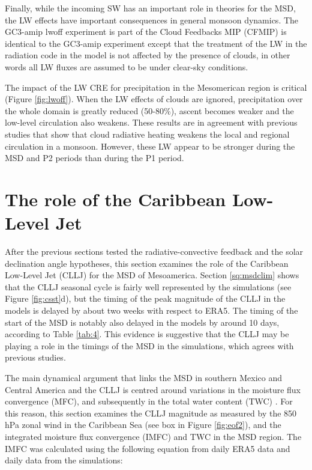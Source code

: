 Finally, while the incoming SW has an important role in theories for the MSD, the LW effects have important consequences in general monsoon dynamics. 
The GC3-amip lwoff experiment is part of the Cloud Feedbacks MIP (CFMIP) is identical to the GC3-amip experiment except that the treatment of the LW in the radiation code in the model is not affected by the presence of clouds, in other words all LW fluxes are assumed to be under clear-sky conditions. 

The impact of the LW CRE for precipitation in the Mesomerican region is critical (Figure \ref{fig:lwoff}). When the LW effects of clouds are ignored, precipitation over the whole domain is greatly reduced (50-80\%), ascent becomes weaker and the low-level circulation also weakens. 
These results are in agreement with previous studies \citep{guo2015,byrne2020} that show that cloud radiative heating weakens the local and regional circulation in a monsoon. However, these LW appear to be stronger during the MSD and P2 periods than during the P1 period. 





\section{The role of the Caribbean Low-Level Jet}



After the previous sections tested the radiative-convective feedback and the solar declination angle hypotheses, this section examines the role of the Caribbean Low-Level Jet (CLLJ) for the MSD of Mesoamerica. Section \ref{sq:msdclim} shows that the CLLJ seasonal cycle is fairly well represented by the simulations (see Figure \ref{fig:csst}d), but the timing of the peak magnitude of the CLLJ in the models is delayed by about two weeks with respect to ERA5. The timing of the start of the MSD is notably also delayed in the models by around 10 days, according to Table \ref{tab:4}. This evidence is suggestive that the CLLJ may be playing a role in the timings of the MSD in the simulations, which agrees with previous studies.


The main dynamical argument that links the MSD in southern Mexico and Central America and the CLLJ is centred around variations in the moisture flux convergence (MFC), and subsequently in the total water content (TWC) \citep[see e.g.][]{gamble2008,herrera2015,martinez2019,zermeno2019}. For this reason, this section examines the CLLJ magnitude as measured by the 850 hPa zonal wind in the Caribbean Sea (see box in Figure \ref{fig:eof2}), and the integrated moisture flux convergence (IMFC) and TWC in the MSD region. 
The IMFC was calculated using the following equation from daily ERA5 data and daily data from the simulations:

